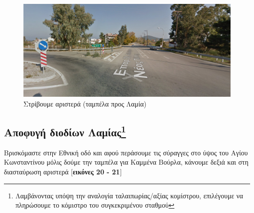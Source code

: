 \begin{figure}[H]
		\includegraphics[width=\textwidth]{images/athina-lamia/tragana/tragana7.PNG}
			\caption{Στρίβουμε αριστερά (ταμπέλα προς Λαμία)}
\end{figure}
\newpage
\begin{center}
\section*{Αποφυγή διοδίων Λαμίας\footnote{Λαμβάνοντας υπόψη την αναλογία ταλαιπωρίας/αξίας κομίστρου, επιλέγουμε να πληρώσουμε το κόμιστρο του συγκεκριμένου σταθμού}}
\end{center}
Βρισκόμαστε στην Εθνική οδό και αφού περάσουμε τις σύραγγες στο ύψος του Αγίου Κωνσταντίνου μόλις δούμε την ταμπέλα για Καμμένα Βούρλα, κάνουμε δεξιά και στη διασταύρωση αριστερά [\textbf{εικόνες 20 - 21}]
		
